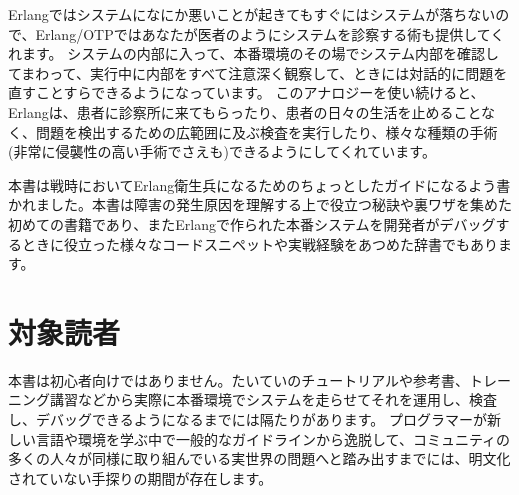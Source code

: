 Erlangではシステムになにか悪いことが起きてもすぐにはシステムが落ちないので、Erlang/OTPではあなたが医者のようにシステムを診察する術も提供してくれます。
システムの内部に入って、本番環境のその場でシステム内部を確認してまわって、実行中に内部をすべて注意深く観察して、ときには対話的に問題を直すことすらできるようになっています。
このアナロジーを使い続けると、Erlangは、患者に診察所に来てもらったり、患者の日々の生活を止めることなく、問題を検出するための広範囲に及ぶ検査を実行したり、様々な種類の手術(非常に侵襲性の高い手術でさえも)できるようにしてくれています。

本書は戦時においてErlang衛生兵になるためのちょっとしたガイドになるよう書かれました。本書は障害の発生原因を理解する上で役立つ秘訣や裏ワザを集めた初めての書籍であり、またErlangで作られた本番システムを開発者がデバッグするときに役立った様々なコードスニペットや実戦経験をあつめた辞書でもあります。

\section*{対象読者}
\label{sec:who-is-this-for}

本書は初心者向けではありません。たいていのチュートリアルや参考書、トレーニング講習などから実際に本番環境でシステムを走らせてそれを運用し、検査し、デバッグできるようになるまでには隔たりがあります。
プログラマーが新しい言語や環境を学ぶ中で一般的なガイドラインから逸脱して、コミュニティの多くの人々が同様に取り組んでいる実世界の問題へと踏み出すまでには、明文化されていない手探りの期間が存在します。

